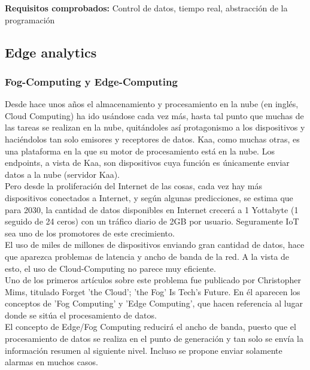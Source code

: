\documentclass[12pt, twoside]{book}
\begin{document}
\textbf{Requisitos comprobados: } Control de datos, tiempo real, abstracción de la programación


\subsection{Edge analytics}
\subsubsection*{Fog-Computing y Edge-Computing}
Desde hace unos años el almacenamiento y procesamiento en la nube (en inglés, Cloud Computing) ha ido usándose cada vez más, hasta tal punto que muchas de las tareas se realizan en la nube, quitándoles así protagonismo a los dispositivos y haciéndolos tan solo emisores y receptores de datos. Kaa, como muchas otras, es una plataforma en la que su motor de procesamiento está en la nube. Los endpoints, a vista de Kaa, son dispositivos cuya función es únicamente enviar datos a la nube (servidor Kaa). \\
Pero desde la proliferación del Internet de las cosas, cada vez hay más dispositivos conectados a Internet, y según algunas predicciones, se estima que para 2030, la cantidad de datos disponibles en Internet crecerá a 1 Yottabyte (1 seguido de 24 ceros) con un tráfico diario de 2GB por usuario. Seguramente IoT sea uno de los promotores de este crecimiento. \\
El uso de miles de millones de dispositivos enviando gran cantidad de datos, hace que aparezca problemas de latencia y ancho de banda de la red. A la vista de esto, el uso de Cloud-Computing no parece muy eficiente.\\ %
Uno de los primeros artículos sobre este problema fue publicado por Christopher Mims, titulado Forget 'the Cloud'; 'the Fog' Is Tech's Future\cite{wsj}. En él aparecen los conceptos de 'Fog Computing' y 'Edge Computing', que hacen referencia al lugar donde se sitúa el procesamiento de datos.\\
El concepto de Edge/Fog Computing reducirá el ancho de banda, puesto que el procesamiento de datos se realiza en el punto de generación y tan solo se envía la información resumen al siguiente nivel. Incluso se propone enviar solamente alarmas en muchos casos. 
\end{document}
